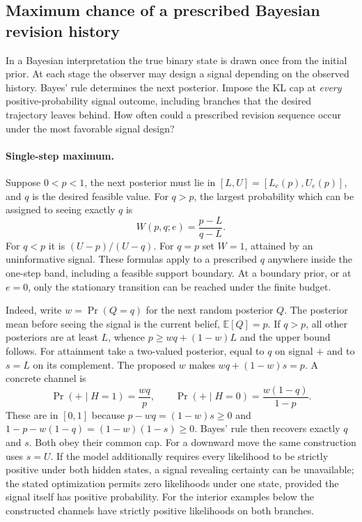 \documentclass[12pt,letterpaper]{article}
\begin{document}
\subsection{Maximum chance of a prescribed Bayesian revision history}
\label{sec:bd-bayesian}

In a Bayesian interpretation the true binary state is drawn once from the initial prior. At each stage the observer may design a signal depending on the observed history. Bayes' rule determines the next posterior. Impose the KL cap at \emph{every} positive-probability signal outcome, including branches that the desired trajectory leaves behind. How often could a prescribed revision sequence occur under the most favorable signal design?

\paragraph{Single-step maximum.}
Suppose $0<p<1$, the next posterior must lie in $[L,U]=[L_e(p),U_e(p)]$, and $q$ is the desired feasible value. For $q>p$, the largest probability which can be assigned to seeing exactly $q$ is
\[
 W(p,q;e)=\frac{p-L}{q-L}.
\]
For $q<p$ it is $(U-p)/(U-q)$. For $q=p$ set $W=1$, attained by an uninformative signal. These formulas apply to a prescribed $q$ anywhere inside the one-step band, including a feasible support boundary. At a boundary prior, or at $e=0$, only the stationary transition can be reached under the finite budget.

Indeed, write $w=\Pr(Q=q)$ for the next random posterior $Q$. The posterior mean before seeing the signal is the current belief, $\mathbb E[Q]=p$. If $q>p$, all other posteriors are at least $L$, whence $p\geq wq+(1-w)L$ and the upper bound follows. For attainment take a two-valued posterior, equal to $q$ on signal $+$ and to $s=L$ on its complement. The proposed $w$ makes $wq+(1-w)s=p$. A concrete channel is
\[
 \Pr(+\mid H=1)=\frac{wq}{p},
 \qquad
 \Pr(+\mid H=0)=\frac{w(1-q)}{1-p}.
\]
These are in $[0,1]$ because $p-wq=(1-w)s\geq0$ and $1-p-w(1-q)=(1-w)(1-s)\geq0$. Bayes' rule then recovers exactly $q$ and $s$. Both obey their common cap. For a downward move the same construction uses $s=U$. If the model additionally requires every likelihood to be strictly positive under both hidden states, a signal revealing certainty can be unavailable; the stated optimization permits zero likelihoods under one state, provided the signal itself has positive probability. For the interior examples below the constructed channels have strictly positive likelihoods on both branches.
\end{document}
